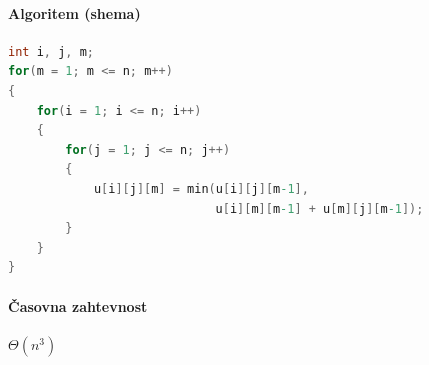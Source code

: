 \documentclass[a4paper,10pt]{article}
\begin{document}
\paragraph{Algoritem (shema)}
\begin{flushleft}
\begin{lstlisting}[language=C]
int i, j, m;
for(m = 1; m <= n; m++)
{
    for(i = 1; i <= n; i++)
    {
        for(j = 1; j <= n; j++)
        {
            u[i][j][m] = min(u[i][j][m-1],
                             u[i][m][m-1] + u[m][j][m-1]);
        }
    }
}
\end{lstlisting}
\end{flushleft}

\paragraph{\v Casovna zahtevnost}
$\Theta (n^3)$
\end{document}
